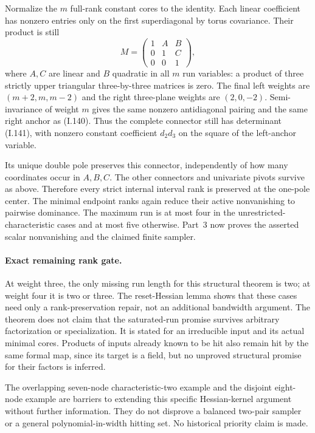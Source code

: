 Normalize the $m$ full-rank constant cores to the identity.
Each linear coefficient has nonzero entries only on the first
superdiagonal by torus covariance. Their product is still
\[
 M=\begin{pmatrix}1&A&B\\0&1&C\\0&0&1\end{pmatrix},
 \tag{I.155}
\]
where $A,C$ are linear and $B$ quadratic in all $m$ run
variables: a product of three strictly upper triangular
three-by-three matrices is zero. The final left weights are
$(m+2,m,m-2)$ and the right three-plane weights are
$(2,0,-2)$. Semi-invariance of weight $m$ gives the same
nonzero antidiagonal pairing and the same right anchor
as (I.140). Thus the complete connector still has determinant
(I.141), with nonzero constant coefficient $d_2d_3$ on the
square of the left-anchor variable.

Its unique double pole preserves this connector, independently
of how many coordinates occur in $A,B,C$. The other connectors
and univariate pivots survive as above. Therefore every strict
internal interval rank is preserved at the one-pole center.
The minimal endpoint ranks again reduce their active
nonvanishing to pairwise dominance. The maximum run is at
most four in the unrestricted-characteristic cases and at
most five otherwise. Part~3 now proves the asserted scalar
nonvanishing and the claimed finite sampler.

\paragraph{Exact remaining rank gate.}
At weight three, the only missing run length for this
structural theorem is two; at weight four it is two or three.
The reset-Hessian lemma shows that these cases need only a
rank-preservation repair, not an additional bandwidth argument.
The theorem does not claim that the saturated-run promise
survives arbitrary factorization or specialization. It is
stated for an irreducible input and its actual minimal cores.
Products of inputs already known to be hit also remain hit
by the same formal map, since its target is a field, but no
unproved structural promise for their factors is inferred.

The overlapping seven-node characteristic-two example and the
disjoint eight-node example are barriers to extending this
specific Hessian-kernel argument without further information.
They do not disprove a balanced two-pair sampler or a general
polynomial-in-width hitting set. No historical priority claim
is made.
